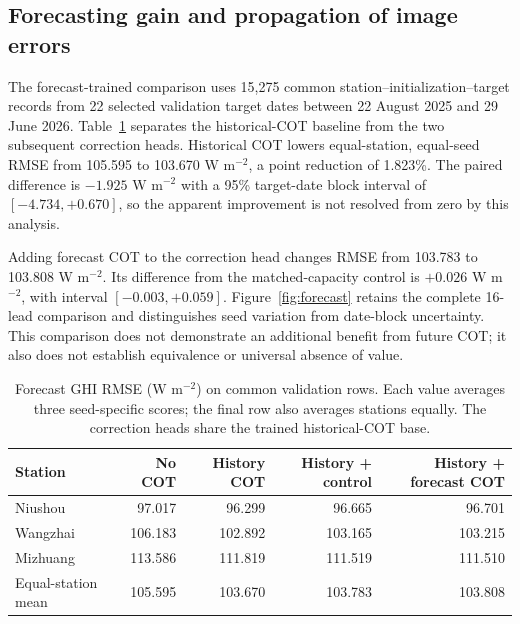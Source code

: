 \documentclass[11pt]{article}
\begin{document}
\FloatBarrier
\subsection{Forecasting gain and propagation of image errors}
The forecast-trained comparison uses 15,275 common station--initialization--target records from 22 selected validation target dates between 22 August 2025 and 29 June 2026. Table~\ref{tab:forecast_values} separates the historical-COT baseline from the two subsequent correction heads. Historical COT lowers equal-station, equal-seed RMSE from 105.595 to 103.670 W m$^{-2}$, a point reduction of 1.823\%. The paired difference is $-1.925$ W m$^{-2}$ with a 95\% target-date block interval of $[-4.734,+0.670]$, so the apparent improvement is not resolved from zero by this analysis.

Adding forecast COT to the correction head changes RMSE from 103.783 to 103.808 W m$^{-2}$. Its difference from the matched-capacity control is $+0.026$ W m$^{-2}$, with interval $[-0.003,+0.059]$. Figure~\ref{fig:forecast} retains the complete 16-lead comparison and distinguishes seed variation from date-block uncertainty. This comparison does not demonstrate an additional benefit from future COT; it also does not establish equivalence or universal absence of value.

\begin{table}[!htbp]\centering\small
\caption{Forecast GHI RMSE (W m$^{-2}$) on common validation rows. Each value averages three seed-specific scores; the final row also averages stations equally. The correction heads share the trained historical-COT base.}\label{tab:forecast_values}
\begin{tabularx}{\linewidth}{Xrrrr}\toprule
Station & No COT & History COT & History + control & History + forecast COT\\\midrule
Niushou & 97.017 & 96.299 & 96.665 & 96.701\\
Wangzhai & 106.183 & 102.892 & 103.165 & 103.215\\
Mizhuang & 113.586 & 111.819 & 111.519 & 111.510\\
Equal-station mean & 105.595 & 103.670 & 103.783 & 103.808\\\bottomrule
\end{tabularx}\end{table}
\end{document}
